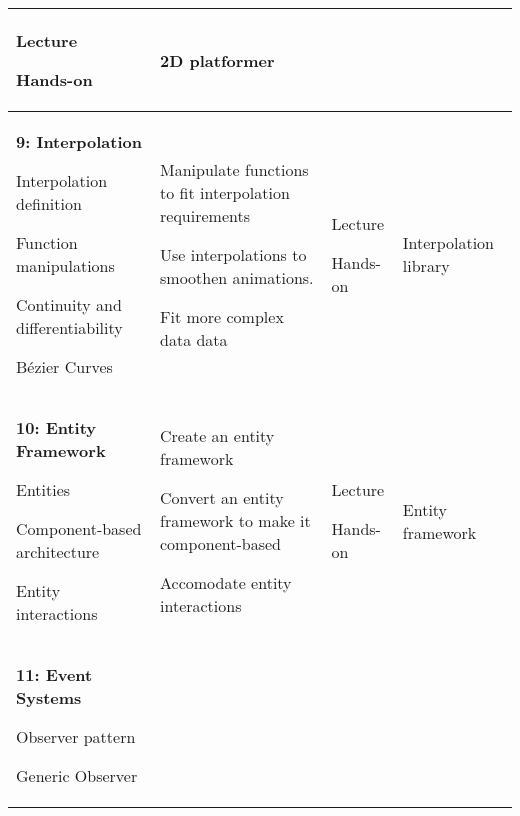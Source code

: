 \documentclass[10pt]{article}
\newenvironment{itemize*}{
\begin{itemize}[leftmargin=1em,noitemsep,nolistsep]
}{\end{itemize}}
\begin{document}
\begin{longtable}{||p{1.8in}|p{2.4in}|p{1.3in}|p{1in}||}
\begin{itemize*}
		\item Lecture
		\item Hands-on
	\end{itemize*} & 2D platformer \\ \hline
\textbf{9: Interpolation}
	\begin{itemize*}
		\item Interpolation definition
		\item Function manipulations
		\item Continuity and differentiability
		\item B\'ezier Curves
	\end{itemize*} &
	\begin{itemize*}
		\item Manipulate functions to fit interpolation requirements
		\item Use interpolations to smoothen animations.
		\item Fit more complex data data
	\end{itemize*} & 
	\begin{itemize*}
		\item Lecture
		\item Hands-on
	\end{itemize*} &
	Interpolation library
		\\ \hline
\textbf{10: Entity Framework}
	\begin{itemize*}
		\item Entities
		\item Component-based architecture
		\item Entity interactions
	\end{itemize*} &
	\begin{itemize*}
		\item Create an entity framework
		\item Convert an entity framework to make it component-based
		\item Accomodate entity interactions
	\end{itemize*} &
	\begin{itemize*}
		\item Lecture
		\item Hands-on
	\end{itemize*} & Entity framework \\ \hline
\textbf{11: Event Systems}
	\begin{itemize*}
		\item Observer pattern
		\item Generic Observer
	\end{itemize*} &

\end{longtable}
\end{document}
